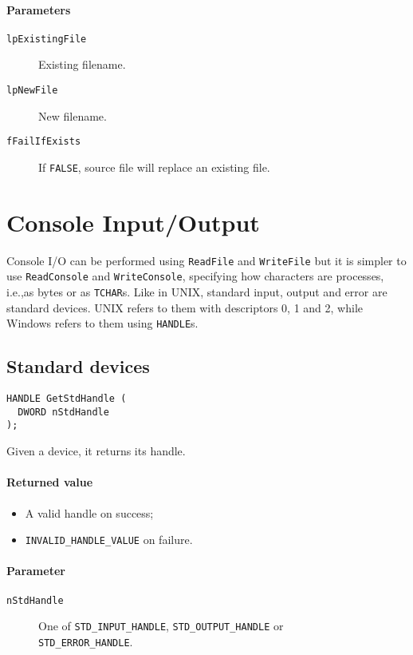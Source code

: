 \paragraph{Parameters}
\begin{description}
\item [\texttt{lpExistingFile}] Existing filename.
\item [\texttt{lpNewFile}] New filename.
\item [\texttt{fFailIfExists}] If \texttt{FALSE}, source file will replace an existing file.
\end{description}

\section{Console Input/Output}
Console I/O can be performed using \texttt{ReadFile} and \texttt{WriteFile} but it is simpler to use \texttt{ReadConsole} and \texttt{WriteConsole}, specifying how characters are processes, i.e.,\@ as bytes or as \texttt{TCHAR}s. Like in UNIX, standard input, output and error are standard devices. UNIX refers to them with descriptors 0, 1 and 2, while Windows refers to them using \texttt{HANDLE}s.

\subsection{Standard devices}
\begin{verbatim}
HANDLE GetStdHandle (
  DWORD nStdHandle
);
\end{verbatim}

Given a device, it returns its handle.

\paragraph{Returned value}
\begin{itemize}
\item A valid handle on success;
\item \texttt{INVALID\_HANDLE\_VALUE} on failure.
\end{itemize}

\paragraph{Parameter}
\begin{description}
\item [\texttt{nStdHandle}] One of \texttt{STD\_INPUT\_HANDLE}, \texttt{STD\_OUTPUT\_HANDLE} or \\ \texttt{STD\_ERROR\_HANDLE}.
\end{description}

